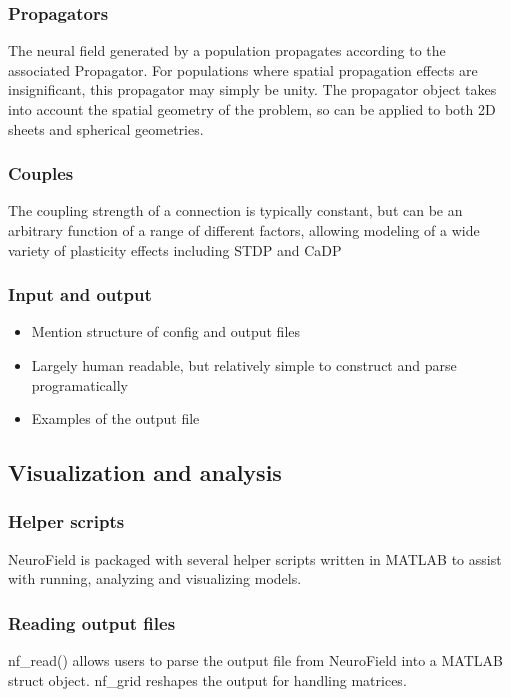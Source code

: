 \documentclass[preprint,review,10pt,authoryear,letterpaper]{elsarticle}
\begin{document}

\subsubsection{Propagators}
The neural field generated by a population propagates according to the associated Propagator. For populations where spatial propagation effects are insignificant, this propagator may simply be unity. The propagator object takes into account the spatial geometry of the problem, so can be applied to both 2D sheets and spherical geometries. 


\subsubsection{Couples}
The coupling strength of a connection is typically constant, but can be an arbitrary function of a range of different factors, allowing modeling of a wide variety of plasticity effects including STDP and CaDP

\subsubsection{Input and output}

\begin{itemize}
	\item  Mention structure of config and output files
	\item Largely human readable, but relatively simple to construct and parse programatically
	\item Examples of the output file
\end{itemize}


\subsection{Visualization and analysis}

\subsubsection{Helper scripts}
NeuroField is packaged with several helper scripts written in MATLAB to assist with running, analyzing and visualizing models. 

\subsubsection{Reading output files}
nf\_read() allows users to parse the output file from NeuroField into a MATLAB struct object.
nf\_grid reshapes the output for handling matrices. 
\end{document}

